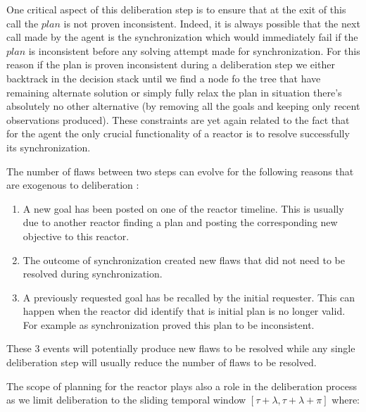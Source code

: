 One critical aspect of this deliberation step is to ensure that at the
exit of this call the $plan$ is not proven inconsistent. Indeed, it is
always possible that the next call made by the agent is the
synchronization which would immediately fail if the $plan$ is
inconsistent before any solving attempt made for synchronization.  For
this reason if the plan is proven inconsistent during a deliberation
step we either backtrack in the decision stack until we find a node fo
the tree that have remaining alternate solution or simply fully relax
the plan in situation there's absolutely no other alternative (by
removing all the goals and keeping only recent observations
produced). These constraints are yet again related to the fact that
for the agent the only crucial functionality of a reactor is to
resolve successfully its synchronization.

The number of flaws between two steps can evolve for the following
reasons that are exogenous to deliberation :

\begin{enumerate}

\item A new goal has been posted on one of the reactor timeline. This
  is usually due to another reactor finding a plan and posting the
  corresponding new objective to this reactor.

\item The outcome of synchronization created new flaws that did not
  need to be resolved during synchronization.

\item A previously requested goal has be recalled by the initial
  requester. This can happen when the reactor did identify that is
  initial plan is no longer valid. For example as synchronization
  proved this plan to be inconsistent.

\end{enumerate}

These 3 events will potentially produce new flaws to be resolved while
any single deliberation step will usually reduce the number of flaws
to be resolved.

The scope of planning for the reactor plays also a role in the
deliberation process as we limit deliberation to the sliding temporal
window $[\tau+\lambda, \tau+\lambda+\pi]$ where:

